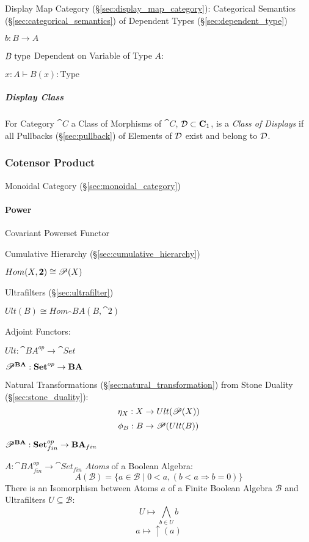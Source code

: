 Display Map Category (\S\ref{sec:display_map_category}): Categorical
Semantics (\S\ref{sec:categorical_semantics}) of Dependent Types
(\S\ref{sec:dependent_type})

$b : B \rightarrow A$

$B \;\mathrm{type}$ Dependent on Variable of Type $A$:

$x:A \vdash B(x):\mathrm{Type}$



\subparagraph{Display Class}\label{sec:display_class}\hfill

For Category $\cat{C}$ a Class of Morphisms of $\cat{C}$, $\mathcal{D}
\subset \mathbf{C}_1$, is a \emph{Class of Displays} if all Pullbacks
(\S\ref{sec:pullback}) of Elements of $\mathcal{D}$ exist and belong to
$\mathcal{D}$.



\subsubsection{Cotensor Product}\label{sec:cotensor_product}

Monoidal Category (\S\ref{sec:monoidal_category})



\paragraph{Power}\label{sec:power}\hfill

Covariant Powerset Functor %

Cumulative Hierarchy (\S\ref{sec:cumulative_hierarchy})

$Hom(X,\mathbf{2}) \cong \mathscr{P}(X)$

Ultrafilters (\S\ref{sec:ultrafilter})

$Ult(B) \cong Hom_\cat{BA}(B,\cat{2})$

Adjoint Functors:

$Ult : \cat{BA}^{op} \rightarrow \cat{Set}$

$\mathscr{P}^\mathbf{BA} : \mathbf{Set}^{op} \rightarrow \mathbf{BA}$

Natural Transformations (\S\ref{sec:natural_transformation}) from
Stone Duality (\S\ref{sec:stone_duality}):
\[
  \eta_X : X \rightarrow Ult(\mathscr{P}(X))
\]\[
  \phi_B : B \rightarrow \mathscr{P}(Ult(B))
\]

$\mathscr{P}^\mathbf{BA} :
  \mathbf{Set}^{op}_{fin} \rightarrow \mathbf{BA}_{fin}$

$A : \cat{BA}^{op}_{fin} \rightarrow \cat{Set}_{fin}$
\emph{Atoms} of a Boolean Algebra:
\[
  A(\mathcal{B}) = \{ a \in \mathcal{B} \;|\;
    0 < a, (b < a \Rightarrow b = 0) \}
\]
There is an Isomorphism between Atoms $a$ of a Finite Boolean Algebra
$\mathcal{B}$ and Ultrafilters $U \subseteq \mathcal{B}$:
\[
  U \mapsto \bigwedge_{b \in U} b
\]\[
  a \mapsto \uparrow (a)
\]



